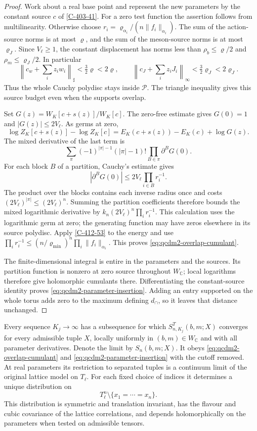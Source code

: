 \documentclass[11pt,letterpaper,reqno]{amsart}
\makeatletter
\theoremstyle{definition}
\newcommand{\ms@majorstart}{%
  \pushQED{\qed}\renewcommand{\qedsymbol}{$\blacksquare\square$}}
\newenvironment{theorem}[1][]{\ms@majorstart\ms@theorem[#1]}
  {\popQED\endms@theorem}
\theoremstyle{remark}
\makeatother
\begin{document}
\begin{proof}
Work about a real base point and represent the new parameters
by the constant source $c$ of \cref{C-403-41}. For a zero test
function the assertion follows from multilinearity. Otherwise
choose $r_i=\varrho_{\alpha_i}/(n\|f_i\|_{\alpha_i})$.
The sum of the action-source norms is at most $\varrho$,
and the sum of the meson-source norms is at most $\varrho_J$.
Since $V_\ell\ge1$, the constant displacement has norms
less than $\rho_b\le\varrho/2$ and
$\rho_m\le\varrho_J/2$. In particular
\[
 \left\|c_w+\sum_i z_iw_i\right\|_\sharp
        <\tfrac32\varrho<2\varrho,
 \qquad
 \left\|c_J+\sum_i z_iJ_i\right\|_\infty
        <\tfrac32\varrho_J<2\varrho_J.
\]
Thus the whole Cauchy polydisc stays inside $\mathcal P$.
The triangle inequality gives this source budget even
when the supports overlap.

Set $G(z)=W_K[c+s(z)]/W_K[c]$. The zero-free estimate gives
$G(0)=1$ and $|G(z)|\le2V_\ell$. As germs at zero,
\[
 \log Z_K[c+s(z)]-\log Z_K[c]
 =E_K(c+s(z))-E_K(c)+\log G(z).
\]
The mixed derivative of the last term is
\[
 \sum_\pi(-1)^{|\pi|-1}(|\pi|-1)!
                 \prod_{B\in\pi}\partial^BG(0).
\]
For each block $B$ of a partition, Cauchy's estimate gives
\[
 |\partial^BG(0)|\le2V_\ell\prod_{i\in B}r_i^{-1}.
\]
The product over the blocks contains each inverse radius
once and costs $(2V_\ell)^{|\pi|}\le(2V_\ell)^n$.
Summing the partition coefficients therefore bounds the
mixed logarithmic derivative by
$k_n(2V_\ell)^n\prod_i r_i^{-1}$. This calculation uses
the logarithmic germ at zero; the generating function
may have zeros elsewhere in its source polydisc.
Apply \cref{C-412-53} to the energy and use
$\prod_i r_i^{-1}\le(n/\varrho_{\min})^n
\prod_i\|f_i\|_{\alpha_i}$. This proves
\eqref{eq:qcdm2-overlap-cumulant}.

The finite-dimensional integral is entire in the parameters
and the sources. Its partition function is nonzero at zero
source throughout $W_{\mathbb C}$; local logarithms therefore
give holomorphic cumulants there. Differentiating the
constant-source identity proves
\eqref{eq:qcdm2-parameter-insertion}. Adding an entry supported
on the whole torus adds zero to the maximum defining
$d_\cap$, so it leaves that distance unchanged.
\end{proof}

\begin{theorem}[Holomorphic families of continuum correlations]\label{C-412-55}
Every sequence $K_j\to\infty$ has a subsequence for which
$S^T_{n,K_j}(b,m;X)$ converges for every admissible tuple $X$,
locally uniformly in $(b,m)\in W_{\mathbb C}$ and with all
parameter derivatives. Denote the limit by $S_n(b,m;X)$.
It obeys \eqref{eq:qcdm2-overlap-cumulant} and
\eqref{eq:qcdm2-parameter-insertion} with the cutoff removed.
At real parameters its restriction to separated tuples is a
continuum limit of the original lattice model on $T_\ell$.
For each fixed choice of indices it determines a unique
distribution on
\[
 T_\ell^n\setminus\{x_1=\cdots=x_n\}.
\]
This distribution is symmetric and translation invariant,
has the flavour and cubic covariance of the lattice
correlations, and depends holomorphically on the parameters
when tested on admissible tensors.
\end{theorem}
\end{document}

